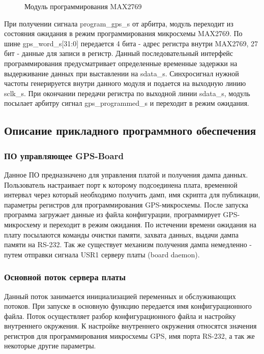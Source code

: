 \begin{figure}[H]
\begin{center}
\end{center}
\caption{Модуль программирования MAX2769}
\label{pic:gps_program}
\end{figure}

При получении сигнала program\_gps\_s от арбитра, модуль переходит из состояния ожидания в режим программирования микросхемы
MAX2769. По шине gps\_word\_s[31:0] передается 4 бита - адрес регистра внутри MAX2769, 27 бит - данные для записи в регистр.
Данный последовательный интерфейс программирования предусматривает определенные временные задержки на выдерживание данных
при выставлении на sdata\_s. Синхросигнал нужной частоты генерируется внутри данного модуля и подается на выходную линию sclk\_s.
При окончании передачи регистра по выходной линии sdata\_s, модуль посылает арбитру сигнал gps\_programmed\_s и переходит в режим
ожидания.

\subsection{Описание прикладного программного обеспечения}
\subsubsection*{ПО управляющее GPS-Board}
\label{sec:board_daemon}
Данное ПО предназначено для управления платой и получения дампа данных. Пользователь настраивает порт к которому подсоединена плата,
временной интервал через который необходимо получить дамп, имя скрипта для публикации, параметры регистров для программирования
GPS-микросхемы. После запуска программа загружает данные из файла конфигурации, программирует GPS-микросхему и переходит в режим
ожидания. По истечении времени ожидания на плату посылаются команды очистки памяти, захвата данных, выдачи дампа памяти на RS-232.
Так же существует механизм получения дампа немедленно - путем отправки сигнала USR1 серверу платы (board daemon).

\subsubsection*{Основной поток сервера платы}
Данный поток занимается инициализацией переменных и обслуживающих потоков. При запуске в основную функцию передается
имя конфигурационного файла. Поток осуществляет разбор конфигурационного файла и настройку внутреннего окружения.
К настройке внутреннего окружения относятся значения регистров для программирования микросхемы GPS, имя порта RS-232, а
так же некоторые другие параметры.


